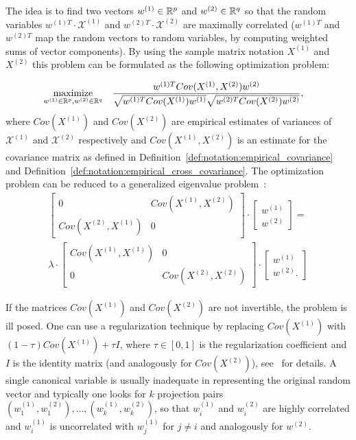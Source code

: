 The idea is to find two vectors $w^{(1)} \in \mathbb{R}^p$ and $w^{(2)} \in \mathbb{R}^q$ so that the random variables
$w^{(1)T} \cdot \mathcal{X}^{(1)}$ and $w^{(2)T} \cdot \mathcal{X}^{(2)}$ are maximally correlated
($w^{(1)T}$ and $w^{(2)T}$ map the random vectors to random variables, by computing weighted
sums of vector components). By using the sample matrix notation $X^{(1)}$ and $X^{(2)}$ this problem can
be formulated as the following optimization problem:

\begin{equation}\label{eq:background:cca:original}
\begin{aligned}
& \underset{w^{(1)} \in \mathbb{R}^{p}, w^{(2)} \in \mathbb{R}^{q}}{\text{maximize}}
& & \frac{w^{(1)T} Cov(X^{(1)},X^{(2)}) w^{(2)}}{\sqrt{w^{(1)T} Cov(X^{(1)}) w^{(1)}} \sqrt{w^{(2)T} Cov(X^{(2)}) w^{(2)}}},
\end{aligned}
\end{equation}
where $Cov(X^{(1)})$ and $Cov(X^{(2)})$ are empirical estimates of variances of $\mathcal{X}^{(1)}$ and $\mathcal{X}^{(2)}$
respectively and $Cov(X^{(1)},X^{(2)})$ is an estimate for the covariance matrix as defined
in Definition~\ref{def:notation:empirical_covariance} and Definition~\ref{def:notation:empirical_cross_covariance}.
The optimization problem can be reduced to a generalized eigenvalue problem~\cite{HardoonCCA}:
\begin{align}\label{eq:background:cca:eigen}
\begin{bmatrix}
    0       & Cov(X^{(1)},X^{(2)}) \\
    Cov(X^{(2)},X^{(1)})& 0
\end{bmatrix}
\cdot
\begin{bmatrix}
    w^{(1)} \\
    w^{(2)}
\end{bmatrix}
= \nonumber \\
\lambda
\cdot
\begin{bmatrix}
    Cov(X^{(1)},X^{(1)}) & 0 \\
    0 &  Cov(X^{(2)},X^{(2)})
\end{bmatrix}
\cdot
\begin{bmatrix}
    w^{(1)} \\
    w^{(2)}.
\end{bmatrix}
\end{align}

If the matrices $Cov(X^{(1)})$ and $Cov(X^{(2)})$ are not invertible, the problem is ill posed.
One can use a regularization technique by replacing $Cov(X^{(1)})$ with $(1- \tau)Cov(X^{(1)}) + \tau I$,
where $\tau \in [0,1]$ is the regularization coefficient and $I$ is the identity matrix (and analogously for $Cov(X^{(2)})$),
see~\cite{shawe-taylor04kernel} for details.
A single canonical variable is usually inadequate in representing the original random vector and typically one
looks for $k$ projection pairs $(w^{(1)}_1, w^{(2)}_1),\ldots,(w^{(1)}_k, w^{(2)}_k)$, so that $w^{(1)}_i$ and $w^{(2)}_i$ are
highly correlated and $w^{(1)}_i$ is uncorrelated with $w^{(1)}_j$  for $j \neq i$ and analogously for $w^{(2)}$.

